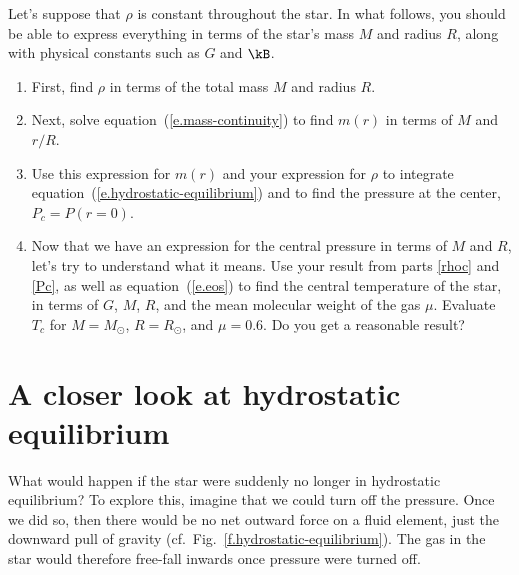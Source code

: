 \begin{exercisebox}
\label{ex.constant-density-star}
Let's suppose that $\rho$ is constant throughout the star. 
In what follows, you should be able to express everything in terms of the star's mass $M$ and radius $R$, along with physical constants such as $G$ and $\kB$.

\begin{enumerate}
\item\label{rhoc} First, find $\rho$ in terms of the total mass $M$ and radius $R$.

\item Next, solve equation~(\ref{e.mass-continuity}) to find $m(r)$ in terms of $M$ and $r/R$.

\item\label{Pc} Use this expression for $m(r)$ and your expression for $\rho$ to integrate equation~(\ref{e.hydrostatic-equilibrium}) and to find the pressure at the center, $P_{c} = P(r=0)$.

\item
Now that we have an expression for the central pressure in terms of $M$ and $R$, let's try to understand what it means. Use your result from parts \ref{rhoc} and \ref{Pc}, as well as equation~(\ref{e.eos}) to find the central temperature of the star, in terms of $G$, $M$, $R$, and the mean molecular weight of the gas $\mu$.  Evaluate $T_{c}$ for $M=M_{\odot}$, $R=R_{\odot}$, and $\mu = 0.6$.  Do you get a reasonable result?
\end{enumerate}
\end{exercisebox}

\section{A closer look at hydrostatic equilibrium}
\label{s.closer-look}

What would happen if the star were suddenly no longer in hydrostatic equilibrium? To explore this, imagine that we could turn off the pressure. Once we did so, then there would be no net outward force on a fluid element, just the downward pull of gravity (cf.\ Fig.~\ref{f.hydrostatic-equilibrium}). The gas in the star would therefore free-fall inwards once pressure were turned off. 

